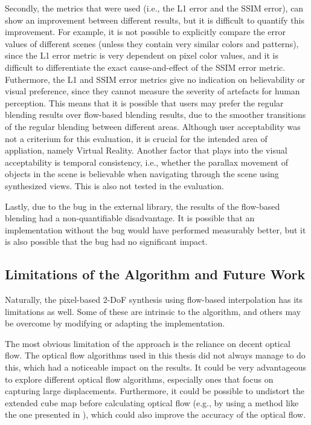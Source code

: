 Secondly, the metrics that were used (i.e., the L1 error and the SSIM error), can show an improvement between different results, but it is difficult to quantify this improvement. For example, it is not possible to explicitly compare the error values of different scenes (unless they contain very similar colors and patterns), since the L1 error metric is very dependent on pixel color values, and it is difficult to differentiate the exact cause-and-effect of the SSIM error metric. Futhermore, the L1 and SSIM error metrics give no indication on believability or visual preference, since they cannot measure the severity of artefacts for human perception. This means that it is possible that users may prefer the regular blending results over flow-based blending results, due to the smoother transitions of the regular blending between different areas. Although user acceptability was not a criterium for this evaluation, it is crucial for the intended area of appliation, namely Virtual Reality. Another factor that plays into the visual acceptability is temporal consistency, i.e., whether the parallax movement of objects in the scene is believable when navigating through the scene using synthesized views. This is also not tested in the evaluation.

Lastly, due to the bug in the external library, the results of the flow-based blending had a non-quantifiable disadvantage. It is possible that an implementation without the bug would have performed measurably better, but it is also possible that the bug had no significant impact.

\subsection{Limitations of the Algorithm and Future Work}
Naturally, the pixel-based 2-DoF synthesis using flow-based interpolation has its limitations as well. Some of these are intrinsic to the algorithm, and others may be overcome by modifying or adapting the implementation.

The most obvious limitation of the approach is the reliance on decent optical flow. The optical flow algorithms used in this thesis did not always manage to do this, which had a noticeable impact on the results. It could be very advantageous to explore different optical flow algorithms, especially ones that focus on capturing large displacements. Furthermore, it could be possible to undistort the extended cube map before calculating optical flow (e.g., by using a method like the one presented in \cite{fov}), which could also improve the accuracy of the optical flow.

